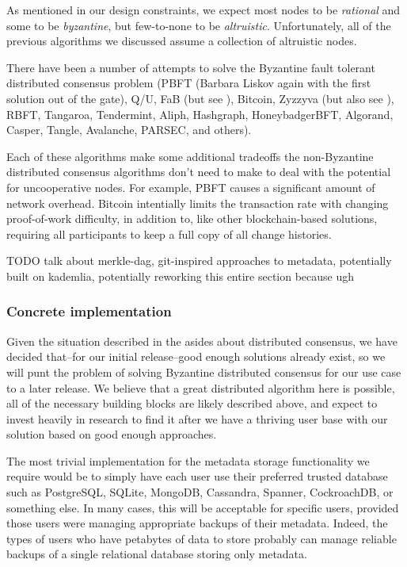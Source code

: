 \documentclass[a4paper,10pt]{article}
\newcommand{\todo}[1]{{\color{red} TODO #1}}
\begin{document}
As mentioned in our design constraints, we expect most nodes to be
{\em rational} and some to be {\em byzantine}, but few-to-none to be
{\em altruistic}. Unfortunately, all of the previous algorithms we discussed
assume a collection of altruistic nodes.

There have been a number of attempts to solve the Byzantine fault
tolerant distributed consensus problem (PBFT\cite{pbft} (Barbara Liskov again
with the first solution out of the gate), Q/U\cite{qu},
FaB\cite{fab} (but see \cite{fab-revisited}), Bitcoin\cite{bitcoin},
Zyzzyva\cite{zyzzyva} (but also see \cite{fab-revisited}),
RBFT\cite{rbft}, Tangaroa\cite{tangaroa}, Tendermint\cite{tendermint},
Aliph\cite{aliph}, Hashgraph\cite{hashgraph}, HoneybadgerBFT\cite{honeybadger},
Algorand\cite{algorand}, Casper\cite{casper}, Tangle\cite{tangle},
Avalanche\cite{avalanche}, PARSEC\cite{parsec}, and others\cite{mickens-bft}).

Each of these algorithms make some additional tradeoffs the non-Byzantine
distributed consensus algorithms don't need to make to deal with the potential
for uncooperative nodes. For example, PBFT causes a significant amount of
network overhead. Bitcoin intentially limits the transaction rate with
changing proof-of-work difficulty, in addition to, like other blockchain-based
solutions, requiring all participants to keep a full copy of all change
histories.

\todo{talk about merkle-dag, git-inspired approaches to metadata, potentially
built on kademlia, potentially reworking this entire section because ugh}

\subsubsection{Concrete implementation}

Given the situation described in the asides about distributed consensus, we
have decided that--for our initial release--good enough solutions already exist,
so we will punt the problem of solving Byzantine distributed consensus for
our use case to a later release. We believe that a great distributed algorithm
here is possible, all of the necessary building blocks are likely described
above, and expect to invest heavily in research to find it after we have a
thriving user base with our solution based on good enough approaches.

The most trivial implementation for the metadata storage functionality we
require would be to simply have each user use their preferred trusted database
such as PostgreSQL, SQLite, MongoDB, Cassandra\cite{cassandra},
Spanner\cite{spanner}, CockroachDB, or something else. In many cases, this will
be acceptable for specific users, provided those users were managing
appropriate backups of their metadata. Indeed, the types of users who have
petabytes of data to store probably can manage reliable backups of a single
relational database storing only metadata.
\end{document}
